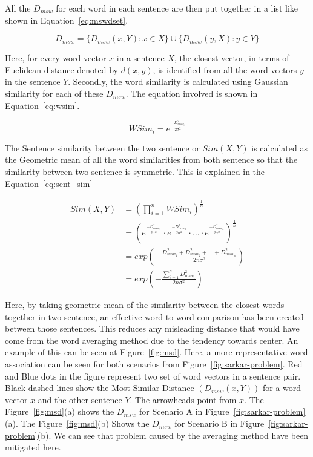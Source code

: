 All the $D_{msw}$ for each word in each sentence are then put together in a list like shown in
Equation~\ref{eq:mswdset}.

\begin{equation}
    D_{msw} = \{D_{msw}(x,Y) : x \in X\} \cup \{D_{msw}(y,X) : y \in Y\}
    \label{eq:mswdset}
\end{equation}

Here, for every word vector $x$ in a sentence $X$, the closest vector, in terms of
Euclidean distance denoted by $d(x,y)$, is identified from all the word vectors $y$ in the sentence $Y$.
Secondly, the word similarity is calculated using Gaussian similarity for each of these $D_{msw}$.
The equation involved is shown in Equation~\ref{eq:wsim}.

\begin{equation}\label{eq:wsim}
    WSim_i = e^{\frac{-D_{msw_i}^2}{2\sigma^2}}
\end{equation}

The Sentence similarity between the two sentence or $Sim(X,Y)$ is calculated as the Geometric
mean of all the word similarities from both sentence so that the similarity between two sentence is symmetric.
This is explained in the Equation~\ref{eq:sent_sim}

\begin{equation}\label{eq:sent_sim}
    \begin{split}
        Sim(X,Y)
        &=  \left(
                \prod_{i=1}^nWSim_i
            \right)^{\frac{1}{n}}\\
        &=  \left(
                e^{\frac{-D_{msw_1}^2}{2\sigma^2}}\cdot
                e^{\frac{-D_{msw_2}^2}{2\sigma^2}}\cdot
                    \ldots \cdot
                e^{\frac{-D_{msw_n}^2}{2\sigma^2}}
            \right)^\frac{1}{n}\\
        &=  exp\left(
                -\frac{D_{msw_1}^2+D_{msw_2}^2+\ldots+D_{msw_n}^2}{2n\sigma^2}
            \right)\\
        &=  exp\left(
                -\frac{\sum_{i=1}^nD_{msw_i}^2}{2n\sigma^2}
            \right)
    \end{split}
\end{equation}

Here, by taking geometric mean of the similarity between the closest words together in two sentence,
an effective word to word comparison has been created between those sentences.
This reduces any misleading distance that would have come from the word averaging method due to
the tendency towards center.
An example of this can be seen at Figure~\ref{fig:msd}.
Here, a more representative word association can be seen for both scenarios from Figure~\ref{fig:sarkar-problem}.
Red and Blue dots in the figure represent two set of word vectors in a sentence pair.
Black dashed lines show the Most Similar Distance $(D_{msw}(x,Y))$ for a word vector $x$ and the other sentence $Y$.
The arrowheads point from $x$.
The Figure~\ref{fig:msd}(a) shows the $D_{msw}$ for Scenario A in Figure~\ref{fig:sarkar-problem}(a).
The Figure~\ref{fig:msd}(b) Shows the $D_{msw}$ for Scenario B in Figure~\ref{fig:sarkar-problem}(b).
We can see that problem caused by the averaging method have been mitigated here.\\

